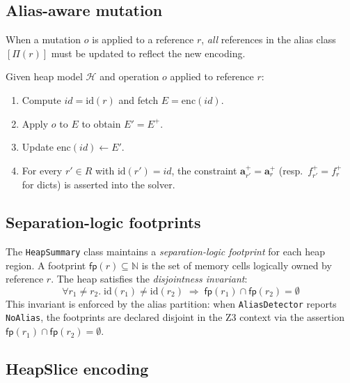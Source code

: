 \documentclass[11pt]{article}
\newcommand{\arrvar}[1]{\mathbf{a}_{#1}}
\newcommand{\poststate}[1]{#1^{+}}
\newcommand{\HeapMod}{\mathcal{H}}
\newcommand{\footprint}{\mathsf{fp}}
\begin{document}
\subsection{Alias-aware mutation}

When a mutation $o$ is applied to a reference $r$, \emph{all} references in
the alias class $[\Pi(r)]$ must be updated to reflect the new encoding.

\begin{definition}\label{def:aliasmut}
Given heap model $\HeapMod$ and operation $o$ applied to reference $r$:
\begin{enumerate}[label=(\arabic*),nosep]
  \item Compute $\mathit{id} = \mathrm{id}(r)$ and fetch $E = \mathrm{enc}(\mathit{id})$.
  \item Apply $o$ to $E$ to obtain $E' = \poststate{E}$.
  \item Update $\mathrm{enc}(\mathit{id}) \leftarrow E'$.
  \item For every $r' \in R$ with $\mathrm{id}(r') = \mathit{id}$, the
        constraint $\poststate{\arrvar{r'}} = \poststate{\arrvar{r}}$
        (resp.\ $\poststate{f_{r'}} = \poststate{f_r}$ for dicts) is
        asserted into the solver.
\end{enumerate}
\end{definition}

\subsection{Separation-logic footprints}

The \texttt{HeapSummary} class maintains a \emph{separation-logic footprint}
for each heap region.  A footprint $\footprint(r) \subseteq \mathbb{N}$ is the
set of memory cells logically owned by reference $r$.  The heap satisfies the
\emph{disjointness invariant}:
\[
  \forall r_1 \neq r_2.\;\mathrm{id}(r_1) \neq \mathrm{id}(r_2) \;\Rightarrow\;
  \footprint(r_1) \cap \footprint(r_2) = \emptyset
\]
This invariant is enforced by the alias partition: when \texttt{AliasDetector}
reports \texttt{NoAlias}, the footprints are declared disjoint in the Z3
context via the assertion $\footprint(r_1) \cap \footprint(r_2) = \emptyset$.

\subsection{HeapSlice encoding}
\end{document}
